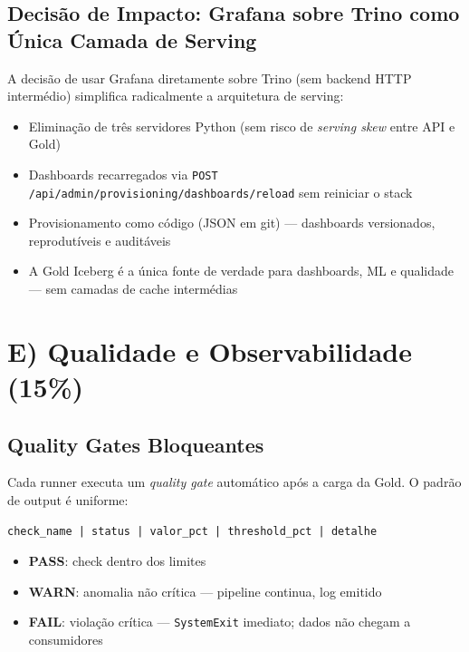\documentclass[11pt,a4paper]{article}
\begin{document}
\subsection{Decisão de Impacto: Grafana sobre Trino como Única Camada de Serving}

A decisão de usar Grafana diretamente sobre Trino (sem backend HTTP intermédio) simplifica radicalmente a arquitetura de serving:
\begin{itemize}[leftmargin=*,noitemsep]
  \item Eliminação de três servidores Python (sem risco de \textit{serving skew} entre API e Gold)
  \item Dashboards recarregados via \texttt{POST /api/admin/provisioning/dashboards/reload} sem reiniciar o stack
  \item Provisionamento como código (JSON em git) --- dashboards versionados, reprodutíveis e auditáveis
  \item A Gold Iceberg é a única fonte de verdade para dashboards, ML e qualidade --- sem camadas de cache intermédias
\end{itemize}

\section{E) Qualidade e Observabilidade (15\%)}
\label{sec:quality}

\subsection{Quality Gates Bloqueantes}

Cada runner executa um \textit{quality gate} automático após a carga da Gold. O padrão de output é uniforme:

\begin{lstlisting}
check_name | status | valor_pct | threshold_pct | detalhe
\end{lstlisting}

\begin{itemize}[leftmargin=*,noitemsep]
  \item \textbf{\textcolor{pass-green}{PASS}}: check dentro dos limites
  \item \textbf{\textcolor{warn-orange}{WARN}}: anomalia não crítica --- pipeline continua, log emitido
  \item \textbf{\textcolor{fail-red}{FAIL}}: violação crítica --- \texttt{SystemExit} imediato; dados não chegam a consumidores
\end{itemize}
\end{document}
